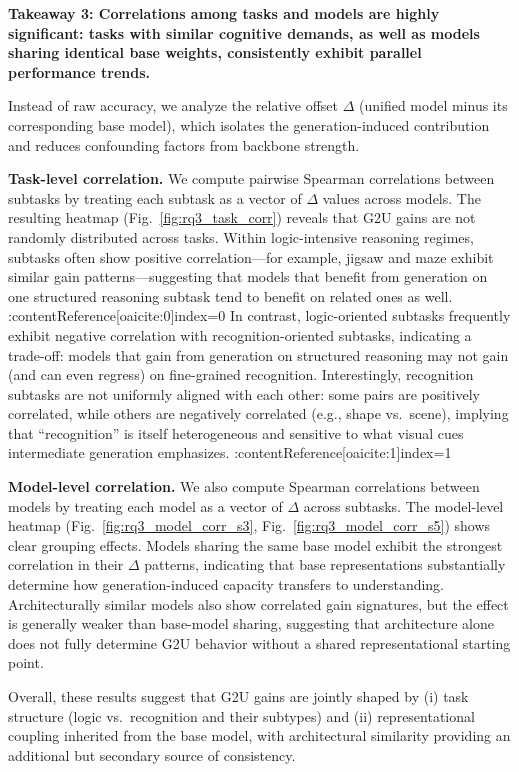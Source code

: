 \documentclass{article}
\theoremstyle{plain}
\theoremstyle{definition}
\theoremstyle{remark}
\begin{document}
\textbf{Takeaway 3: Correlations among tasks and models are highly significant: tasks with similar cognitive demands, as well as models sharing identical base weights, consistently exhibit parallel performance trends.}

Instead of raw accuracy, we analyze the relative offset $\Delta$ (unified model minus its corresponding base model), which isolates the generation-induced contribution and reduces confounding factors from backbone strength.

\textbf{Task-level correlation.}
We compute pairwise Spearman correlations between subtasks by treating each subtask as a vector of $\Delta$ values across models.
The resulting heatmap (Fig.~\ref{fig:rq3_task_corr}) reveals that G2U gains are not randomly distributed across tasks.
Within logic-intensive reasoning regimes, subtasks often show positive correlation—for example, jigsaw and maze exhibit similar gain patterns—suggesting that models that benefit from generation on one structured reasoning subtask tend to benefit on related ones as well. :contentReference[oaicite:0]{index=0}
In contrast, logic-oriented subtasks frequently exhibit negative correlation with recognition-oriented subtasks, indicating a trade-off: models that gain from generation on structured reasoning may not gain (and can even regress) on fine-grained recognition.
Interestingly, recognition subtasks are not uniformly aligned with each other: some pairs are positively correlated, while others are negatively correlated (e.g., shape vs.\ scene), implying that ``recognition'' is itself heterogeneous and sensitive to what visual cues intermediate generation emphasizes. :contentReference[oaicite:1]{index=1}

\textbf{Model-level correlation.}
We also compute Spearman correlations between models by treating each model as a vector of $\Delta$ across subtasks.
The model-level heatmap (Fig.~\ref{fig:rq3_model_corr_s3}, Fig.~\ref{fig:rq3_model_corr_s5}) shows clear grouping effects.
Models sharing the same base model exhibit the strongest correlation in their $\Delta$ patterns, indicating that base representations substantially determine how generation-induced capacity transfers to understanding. 
Architecturally similar models also show correlated gain signatures, but the effect is generally weaker than base-model sharing, suggesting that architecture alone does not fully determine G2U behavior without a shared representational starting point. 

Overall, these results suggest that G2U gains are jointly shaped by (i) task structure (logic vs.\ recognition and their subtypes) and (ii) representational coupling inherited from the base model, with architectural similarity providing an additional but secondary source of consistency.
\end{document}
